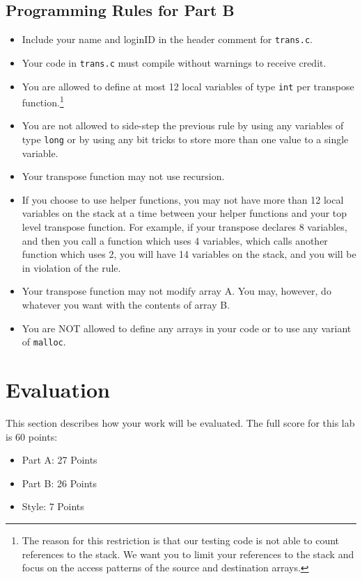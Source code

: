 \documentclass[11pt]{article}
\begin{document}
\subsection*{Programming Rules for Part B}
\begin{itemize}
\item Include your name and loginID in the header comment for {\tt trans.c}.

\item Your code in {\tt trans.c} must compile without warnings to
  receive credit.

\item You are allowed to define at most 12 local variables of type
  \verb:int: per transpose function.\footnote{The reason for this
  restriction is that our testing code is not able to count references
  to the stack. We want you to limit your references to the stack and
  focus on the access patterns of the source and destination arrays.}

\item You are not allowed to side-step the previous rule by using any
  variables of type \verb:long: or by using any bit tricks to store more
  than one value to a single variable.

\item Your transpose function may not use recursion.

\item If you choose to use helper functions, you may not have more than 12
 local variables on the stack at a time between your helper functions and
 your top level transpose function. For example, if your transpose
 declares 8 variables, and then you call a function which uses 4
 variables, which calls another function which uses 2, you will have
 14 variables on the stack, and you will be in violation of the rule.

\item Your transpose function may not modify array A. You may, however,
 do whatever you want with the contents of array B.

\item You are NOT allowed to define any arrays in your code or to use
  any variant of {\tt malloc}.

\end{itemize}

\section{Evaluation}
\label{sec:eval}
This section describes how your work will be evaluated. The full score
for this lab is 60 points:
\begin{itemize}
\item Part A: 27 Points
\item Part B: 26 Points
\item Style: 7 Points
\end{itemize}
\end{document}
